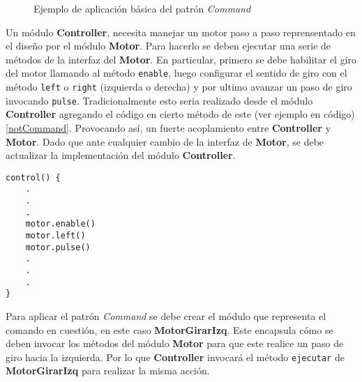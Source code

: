 \begin{figure}[H]
\caption{Ejemplo de aplicación básica del patrón \textit{Command}}
\begin{center}
\end{center}
\end{figure}
Un módulo \textbf{Controller}, necesita manejar un motor paso a paso reprensentado en el diseño por el módulo \textbf{Motor}. Para hacerlo se deben ejecutar una serie de métodos de la interfaz del \textbf{Motor}. En particular, primero se debe habilitar el giro del motor llamando al método \verb|enable|, luego configurar el sentido de giro con el método \verb|left| o \verb|right| (izquierda o derecha) y por ultimo avanzar un paso de giro invocando \verb|pulse|. Tradicionalmente esto seria realizado desde el módulo \textbf{Controller} agregando el código en cierto método de este (ver ejemplo en código) \ref{notCommand}. Provocando así, un fuerte acoplamiento entre \textbf{Controller} y \textbf{Motor}. Dado que ante cualquier cambio de la interfaz de \textbf{Motor}, se debe actualizar la implementación del módulo \textbf{Controller}.


\begin{lstlisting}[label={notCommand}, caption=Ejemplo de implementación sin usar el patrón \textit{Command}.]
control() {
    .
    .
    .
    motor.enable()
    motor.left()
    motor.pulse()
    .
    .
    .  
}
\end{lstlisting}

Para aplicar el patrón \textit{Command} se debe crear el módulo que representa el comando en cuestión, en este caso \textbf{MotorGirarIzq}. Este encapsula cómo se deben invocar los métodos del módulo \textbf{Motor} para que este realice un paso de giro hacia la izquierda. Por lo que \textbf{Controller} invocará el método \verb|ejecutar| de \textbf{MotorGirarIzq} para realizar la misma acción.

